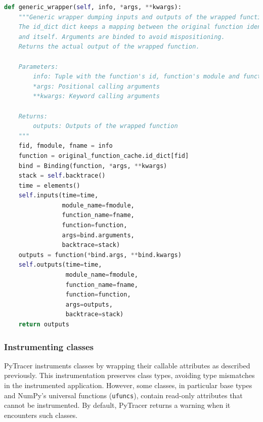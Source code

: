 \documentclass[11pt]{article}
\newcommand{\pytracer}[0]{PyTracer\xspace}
\begin{document}
\begin{listing}
    \centering
\begin{lstlisting}[language=Python,style=customPython,]
def generic_wrapper(self, info, *args, **kwargs):
    """Generic wrapper dumping inputs and outputs of the wrapped function.
    The id_dict dict keeps a mapping between the original function identifier
    and itself. Arguments are binded to avoid mispositioning.
    Returns the actual output of the wrapped function.
    
    Parameters:
        info: Tuple with the function's id, function's module and function's name
        *args: Positional calling arguments
        **kwargs: Keyword calling arguments
    
    Returns:
        outputs: Outputs of the wrapped function
    """
    fid, fmodule, fname = info
    function = original_function_cache.id_dict[fid]
    bind = Binding(function, *args, **kwargs)
    stack = self.backtrace()
    time = elements()
    self.inputs(time=time,
                module_name=fmodule,
                function_name=fname,
                function=function,
                args=bind.arguments,
                backtrace=stack)
    outputs = function(*bind.args, **bind.kwargs)
    self.outputs(time=time,
                 module_name=fmodule,
                 function_name=fname,
                 function=function,
                 args=outputs,
                 backtrace=stack)
    return outputs
\end{lstlisting}
    \caption{\pytracer's wrapper function that dumps
    the inputs and outputs of the wrapped function.
    \pytracer binds arguments to the function signature to avoid
    mispositioning and to have actual names for the visualization.
    The wrapper returns the actual output.
    }
    \label{fig:generic_wrapper}
\end{listing}


\subsubsection{Instrumenting classes}

\pytracer instruments classes by wrapping their callable attributes as described previously. 
This instrumentation preserves class types, avoiding type mismatches in the instrumented application.
However, some classes, in particular base types and NumPy's universal functions (\texttt{ufuncs}), contain read-only attributes that cannot be instrumented. 
By default, \pytracer returns a warning when it encounters such classes. 
\end{document}
